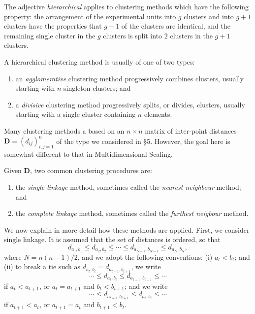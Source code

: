 \documentclass[]{book}
\theoremstyle{definition}
\theoremstyle{definition}
\theoremstyle{definition}
\theoremstyle{remark}
\begin{document}
The adjective \emph{hierarchical} applies to clustering methods which have the following property: the arrangement of the experimental units into \(g\) clusters and into \(g+1\) clusters have the properties that \(g-1\) of the clusters are identical, and the remaining single cluster in the \(g\) clusters is split into \(2\) clusters in the \(g+1\) clusters.

A hierarchical clustering method is usually of one of two types:

\begin{enumerate}
\def\labelenumi{\arabic{enumi}.}
\item
  an \emph{agglomerative} clustering method progressively combines clusters, usually starting with \(n\) singleton clusters; and
\item
  a \emph{divisive} clustering method progressively splits, or divides, clusters, usually starting with a single cluster containing \(n\) elements.
\end{enumerate}

Many clustering methods a based on an \(n \times n\) matrix of inter-point distances \(\boldsymbol D=(d_{ij})_{i,j=1}^n\) of the type we considered in \S 5. However, the goal here is somewhat different to that in Multidimensional Scaling.

Given \(\boldsymbol D\), two common clustering procedures are:

\begin{enumerate}
\def\labelenumi{\arabic{enumi}.}
\item
  the \emph{single linkage} method, sometimes called the \emph{nearest neighbour} method; and
\item
  the \emph{complete linkage} method, sometimes called the \emph{furthest neigbour} method.
\end{enumerate}

We now explain in more detail how these methods are applied. First, we consider single linkage. It is assumed that the set of distances is ordered, so that
\begin{equation}
 d_{a_1,b_1}\leq d_{a_2,b_2} \leq \cdots \leq d_{a_{N-1}, b_{N-1}} \leq d_{a_N,b_N},
\label{eq:orderdist}
 \end{equation}
where \(N=n(n-1)/2\), and we adopt the following conventions: (i) \(a_t < b_t\); and (ii) to break a tie such as \(d_{a_{t},b_{t}} = d_{a_{t+1},b_{t+1}}\), we write
\[
 \cdots \leq d_{a_{t},b_{t}} \leq d_{a_{t+1},b_{t+1}} \leq \cdots
 \]
if \(a_{t} < a_{t+1}\), or \(a_{t}=a_{t+1}\) and \(b_t<b_{t+1}\); and we write
\[
 \cdots \leq d_{a_{t+1},b_{t+1}} \leq d_{a_{t},b_{t}} \leq \cdots
 \]
if \(a_{t+1}<a_t\), or \(a_{t+1}=a_t\) and \(b_{t+1}<b_t\).
\end{document}
